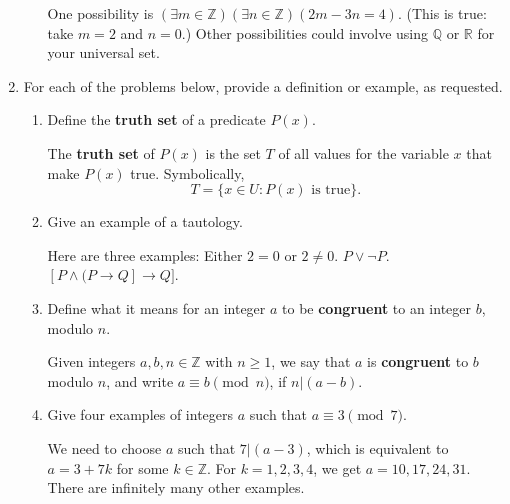 \documentclass[12pt]{article}
\newcommand{\points}[1]{\marginpar{\hspace{24pt}[#1]}}
\newcommand{\R}{\mathbb{R}}
\begin{document}
\begin{enumerate}
\begin{enumerate}
\medskip

One possibility is $(\exists m\in\mathbb{Z})(\exists n\in \mathbb{Z})(2m-3n=4)$. (This is true: take $m=2$ and $n=0$.) Other possibilities could involve using $\mathbb{Q}$ or $\R$ for your universal set.

\end{enumerate}



\newpage

\item For each of the problems below, provide a definition or example, as requested.
\begin{enumerate}
\item Define the {\bf truth set} of a predicate $P(x)$. \points{2}

\medskip

The {\bf truth set} of $P(x)$ is the set $T$ of all values for the variable $x$ that make $P(x)$ true. Symbolically,
\[
 T=\{x\in U : P(x) \text{ is true}\}.
\]

\vspace{1in}

\item Give an example of a tautology. \points{2}

\medskip

Here are three examples: Either $2=0$ or $2\neq 0$. $P\vee \neg P$. $[P\wedge (P\to Q]\to Q]$. 

\vspace{1in}

\item Define what it means for an integer $a$ to be {\bf congruent} to an integer $b$, modulo $n$.\points{2}

\medskip

Given integers $a,b,n\in\mathbb{Z}$ with $n\geq 1$, we say that $a$ is {\bf congruent} to $b$ modulo $n$, and write $a\equiv b\pmod{n}$, if $n|(a-b)$.

\vspace{1in}

\item Give four examples of integers $a$ such that $a\equiv 3 \pmod{7}$. \points{2}

\medskip

We need to choose $a$ such that $7|(a-3)$, which is equivalent to $a=3+7k$ for some $k\in\mathbb{Z}$. For $k=1,2,3,4$, we get $a = 10, 17, 24, 31.$ There are infinitely many other examples.

\vspace{1in}


\end{enumerate}
\end{enumerate}
\end{document}

